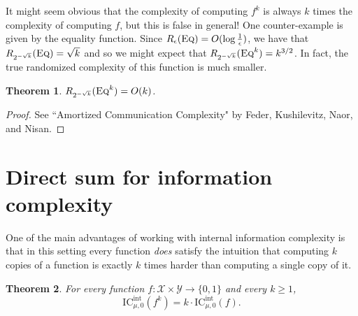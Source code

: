 \documentclass[11pt]{amsart}
\theoremstyle{plain}
\newtheorem{theorem}{Theorem}
\theoremstyle{definition}
\theoremstyle{plain}
\newcommand{\calX}{\mathcal{X}}
\newcommand{\calY}{\mathcal{Y}}
\newcommand{\Eq}{\textsc{Eq}}
\newcommand{\ICint}{\mathrm{IC}^{\mathrm{int}}}
\begin{document}
It might seem obvious that the complexity of computing $f^k$ is always $k$ times the complexity of computing $f$, but this is false in general! One counter-example is given by the equality function. Since $R_\epsilon(\Eq) = O(\log \frac1\epsilon)$, we have that $R_{2^{-\sqrt{k}}}(\Eq) = \sqrt{k}$ and so we might expect that $R_{2^{-\sqrt{k}}}(\Eq^k) = k^{3/2}$. In fact, the true randomized complexity of this function is much smaller.

\begin{theorem}
$R_{2^{-\sqrt{k}}}(\Eq^k) = O(k)$.
\end{theorem}

\begin{proof}
See ``Amortized Communication Complexity" by Feder, Kushilevitz, Naor, and Nisan.
\end{proof}


\newpage 
\section{Direct sum for information complexity}

One of the main advantages of working with internal information complexity is that in this setting every function \emph{does} satisfy the intuition that computing $k$ copies of a function is exactly $k$ times harder than computing a single copy of it.
\begin{theorem}\label{th:9}
For every function $f : \calX \times \calY \to \{0,1\}$ and every $k \ge 1$,
\[
\ICint_{\mu,0}(f^k) = k \cdot \ICint_{\mu,0}(f).
\]
\end{theorem}
\end{document}
